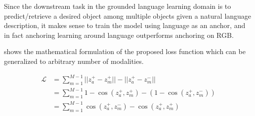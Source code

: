 
Since the downstream task in the grounded language learning domain is to predict/retrieve a desired object among multiple objects given a natural language description, it makes sense to train the model using language as an anchor, and in fact anchoring learning around language outperforms anchoring on RGB.

 shows the mathematical formulation of the proposed loss function which can be generalized to arbitrary number of modalities.


\begin{equation}
\label{eq:objective-simple-mma}
\begin{split}
    \mathcal{L}  &= \sum_{m=1}^{M-1} || z_{a}^{+} - z_{m}^{+} || - || z_{a}^{+} - z_{m}^{-} || \\
    &= \sum_{m=1}^{M-1} 1 - \cos(z_{a}^{+}, z_{m}^{+}) - (1 - \cos(z_{a}^{+}, z_{m}^{-})) \\
    &= \sum_{m=1}^{M-1} \cos(z_{a}^{+} ,z_{m}^{-}) - \cos(z_{a}^{+}, z_{m}^{+})
\end{split}
\end{equation}

